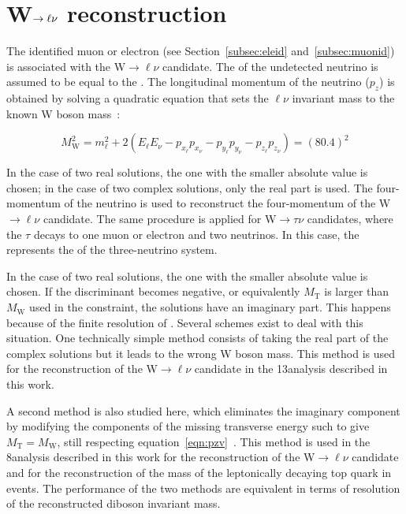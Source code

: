 \section{W$\rightarrow\ell\nu$ reconstruction}\label{sec:leptonicW}

The identified muon or electron (see Section~\ref{subsec:eleid} and~\ref{subsec:muonid}) is associated with the W$\rightarrow\ell\nu$ candidate. 
The \pt of the undetected neutrino is assumed to be equal to the \ETmiss. The longitudinal momentum of the neutrino ($p_z$) is obtained by solving a quadratic equation that sets the $\ell\nu$ invariant
mass to the known W boson mass~\cite{Agashe:2014kda}:

\begin{equation}\label{eqn:pzv}
M_\mathrm{W}^2 = m_\ell^2   + 2(E_\ell E_\nu - p_{x_\ell}p_{x_\nu} - p_{y_\ell}p_{y_\nu} - p_{z_\ell}p_{z_\nu} ) = (80.4)^2
\end{equation}

In the case of two real solutions, the one with the smaller absolute value is chosen; in the case of two complex solutions, only the real part is used.
The four-momentum of the neutrino is used to reconstruct the four-momentum of the W$\rightarrow\ell\nu$ candidate.
The same procedure is applied for W$\rightarrow\tau\nu$ candidates, where the $\tau$ decays to one muon or electron and two neutrinos.
In this case, the \Etmiss represents the \pt of the three-neutrino system.


In the case of two real solutions, the one with the smaller absolute value is chosen. 
If the discriminant becomes negative, or equivalently $M_\mathrm{T}$ is larger than $M_\mathrm{W}$ used in the constraint, the solutions have an imaginary part. This happens because of the finite resolution of \ETmiss.
Several schemes exist to deal with this situation. One technically simple method consists of taking the real part of the complex solutions but it leads to the wrong W boson mass. This method is used for the reconstruction of the W$\rightarrow\ell\nu$ candidate in the 13\TeV analysis described in this work.

A second method is also studied here, which eliminates the imaginary component by modifying the components of the missing transverse energy such to give $M_\mathrm{T} =  M_\mathrm{W}$, still respecting equation~\ref{eqn:pzv}~\cite{BauerPhd10}. This method is used in the 8\TeV analysis described in this work for the reconstruction of the W$\rightarrow\ell\nu$ candidate and for the reconstruction of the mass of the leptonically decaying top quark in \ttbar events. The performance of the two methods are equivalent in terms of resolution of the reconstructed diboson invariant mass.